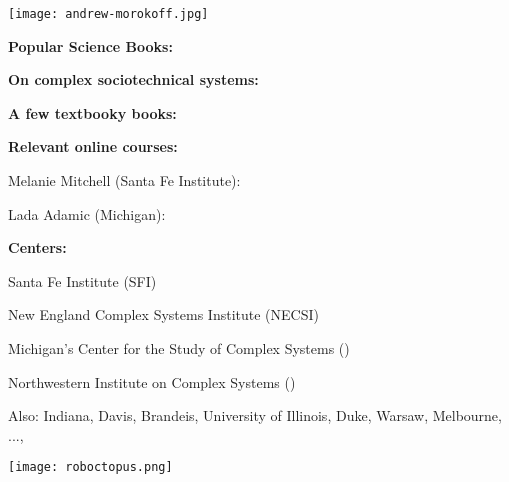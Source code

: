       
\begin{marginfigure}[]
        \texttt{[image: andrew-morokoff.jpg]}
\end{marginfigure}

      

  \textbf{Popular Science Books:}

  \medskip
  \medskip


  \textbf{On complex sociotechnical systems:}

  \medskip
  \medskip


  \textbf{A few textbooky books:}

  \medskip
  \medskip


  \textbf{Relevant online courses:}

  
   
    Melanie Mitchell (Santa Fe Institute): \\
     
    Lada Adamic (Michigan): \\
  


  \textbf{Centers:}

  
  
   
    Santa Fe Institute (SFI)
   
    New England Complex Systems Institute (NECSI)
   
    Michigan's Center for the Study of Complex Systems 
    () 
   
    Northwestern Institute on Complex Systems 
    ()
   
    Also: Indiana, Davis, Brandeis, University of Illinois, Duke, Warsaw, Melbourne, ..., 
  
    
\begin{marginfigure}[]
\texttt{[image: roboctopus.png]}
\end{marginfigure}

  
